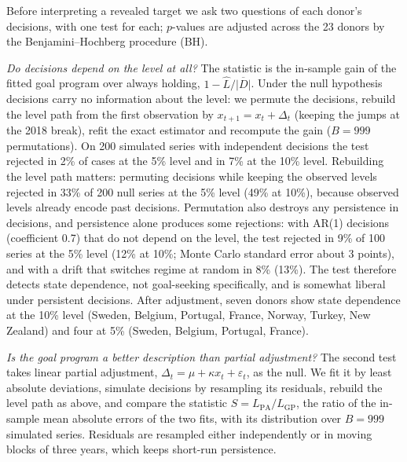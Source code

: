 \documentclass[11pt,a4paper]{article}
\theoremstyle{remark}\newtheorem{remark}{Remark}
\begin{document}
Before interpreting a revealed target we ask two questions of each donor's decisions, with one test for each; $p$-values are adjusted across the 23 donors by the Benjamini--Hochberg procedure (BH).

\emph{Do decisions depend on the level at all?} The statistic is the in-sample gain of the fitted goal program over always holding, $1-\hat L/\overline{|D|}$. Under the null hypothesis decisions carry no information about the level: we permute the decisions, rebuild the level path from the first observation by $x_{t+1}=x_t+\Delta_t$ (keeping the jumps at the 2018 break), refit the exact estimator and recompute the gain ($B=999$ permutations). On 200 simulated series with independent decisions the test rejected in 2\% of cases at the 5\% level and in 7\% at the 10\% level. Rebuilding the level path matters: permuting decisions while keeping the observed levels rejected in 33\% of 200 null series at the 5\% level (49\% at 10\%), because observed levels already encode past decisions. Permutation also destroys any persistence in decisions, and persistence alone produces some rejections: with AR(1) decisions (coefficient 0.7) that do not depend on the level, the test rejected in 9\% of 100 series at the 5\% level (12\% at 10\%; Monte Carlo standard error about 3 points), and with a drift that switches regime at random in 8\% (13\%). The test therefore detects state dependence, not goal-seeking specifically, and is somewhat liberal under persistent decisions. After adjustment, seven donors show state dependence at the 10\% level (Sweden, Belgium, Portugal, France, Norway, Turkey, New Zealand) and four at 5\% (Sweden, Belgium, Portugal, France).

\emph{Is the goal program a better description than partial adjustment?} The second test takes linear partial adjustment, $\Delta_t=\mu+\kappa x_t+\varepsilon_t$, as the null. We fit it by least absolute deviations, simulate decisions by resampling its residuals, rebuild the level path as above, and compare the statistic $S=L_{\mathrm{PA}}/L_{\mathrm{GP}}$, the ratio of the in-sample mean absolute errors of the two fits, with its distribution over $B=999$ simulated series. Residuals are resampled either independently or in moving blocks of three years, which keeps short-run persistence.
\end{document}
